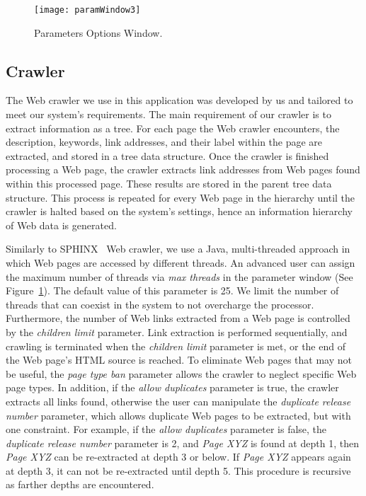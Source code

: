 \documentclass[10pt,psfig]{article}
\begin{document}
{\begin{figure}[t]
\centering
\texttt{[image: paramWindow3]}
\caption{Parameters Options Window.}
\label{fig_paramOpts}
\end{figure}

\subsection{Crawler}
\label{sss:crawler}

The Web crawler we use in this application was developed by us and tailored to meet our system's requirements.  
The main requirement of our crawler is to extract information as a tree.
For each page the Web crawler encounters, the description, keywords, link addresses, and their label within the page are extracted, and stored in a tree data structure.
Once the crawler is finished processing a Web page, the crawler extracts link addresses from Web pages found within this processed page.
These results are stored in the parent tree data structure.
This process is repeated for every Web page in the hierarchy until the crawler is halted based on the system's settings, hence an information hierarchy of Web data is generated.

Similarly to SPHINX~\cite{mb98} Web crawler, we use a Java, multi-threaded approach in which Web pages are accessed by different threads.
An advanced user can assign the maximum number of threads via {\em max threads} in the parameter window (See Figure~\ref{fig_paramOpts}).
The default value of this parameter is 25.
We limit the number of threads that can coexist in the system to not overcharge the processor.
Furthermore, the number of Web links extracted from a Web page is controlled by the {\em children limit} parameter.
Link extraction is performed sequentially, and crawling is terminated when the {\em children limit} parameter is met, 
or the end of the Web page's HTML source is reached.
To eliminate Web pages that may not be useful, the {\em page type ban} parameter allows the crawler to neglect specific Web page types. 
In addition, if the {\em allow duplicates} parameter is true, the crawler extracts all links found, otherwise the user can manipulate the {\em duplicate release number} parameter, which allows duplicate Web pages to be extracted, but with one constraint.
For example, if the {\em allow duplicates} parameter is false,
the {\em duplicate release number} parameter is 2, and {\em Page XYZ} is found at depth 1, then {\em Page XYZ} can be re-extracted at depth 3 or below.
If {\em Page XYZ} appears again at depth 3, it can not be re-extracted until depth 5.  This procedure is recursive as farther depths are encountered.

}
\end{document}

